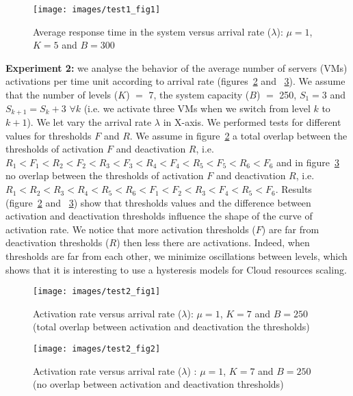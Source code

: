 \documentclass[conference]{IEEEtran}
\begin{document}
\begin{figure}[!ht]
\centering
\texttt{[image: images/test1\_fig1]}
\caption{Average response time in the system versus arrival rate ($\lambda$): $\mu=1$, $K=5$ and $B=300$}
\label{fig:image-chap4-1_par_1-test1_fig1}
\end{figure}

\textbf{Experiment 2:}
we analyse the behavior of the average number of servers (VMs) activations per time unit according to arrival rate
(figures~\ref{fig:image-chap4-1_par_1_test2_fig1} and ~\ref{fig:image-chap4-1_par_1_test2_fig2}). We assume that the number of levels ($K$) $=$ 7, the system capacity ($B$) $=$ 250, $S_{1}=3$
and $S_{k+1}=S_{k}+3$ $\forall k$ (i.e. we activate three VMs when we switch from level $k$ to $k+1$). We let vary  the arrival rate $\lambda$ in X-axis.
We performed tests for different values for thresholds $F$ and $R$.
We assume in figure~\ref{fig:image-chap4-1_par_1_test2_fig1} a total overlap between the thresholds of activation $F$ and deactivation $R$,
i.e. $R_1 < F_1 < R_2 < F_2 < R_3 < F_3 < R_4 < F_4 < R_5 < F_5 < R_6 < F_6$ and in figure~\ref{fig:image-chap4-1_par_1_test2_fig2} no overlap between the thresholds of activation $F$ and deactivation $R$,
i.e. $R_1 < R_2 < R_3 < R_4 < R_5 < R_6 < F_1 < F_2 < R_3 < F_4 < R_5 < F_6$.
Results (figure~\ref{fig:image-chap4-1_par_1_test2_fig1} and ~\ref{fig:image-chap4-1_par_1_test2_fig2}) show that thresholds values and the difference between activation and deactivation
thresholds influence the shape of the curve of activation rate. We notice that more activation thresholds ($F$) are far from deactivation thresholds
($R$) then less there are activations. Indeed, when thresholds are far from each other,
we minimize oscillations between levels, which shows that it is interesting to use a hysteresis models for Cloud resources scaling.

\begin{figure}[!ht]
\centering
\texttt{[image: images/test2\_fig1]}
\caption{Activation rate versus arrival rate ($\lambda$): $\mu=1$, $K=7$ and $B=250$ (total overlap between activation and deactivation the thresholds)}
\label{fig:image-chap4-1_par_1_test2_fig1}
\end{figure}

\begin{figure}[!ht]
\centering
\texttt{[image: images/test2\_fig2]}
\caption{Activation rate versus arrival rate ($\lambda$) : $\mu=1$, $K=7$ and $B=250$ (no overlap between activation and deactivation thresholds)}
\label{fig:image-chap4-1_par_1_test2_fig2}
\end{figure}
\end{document}

